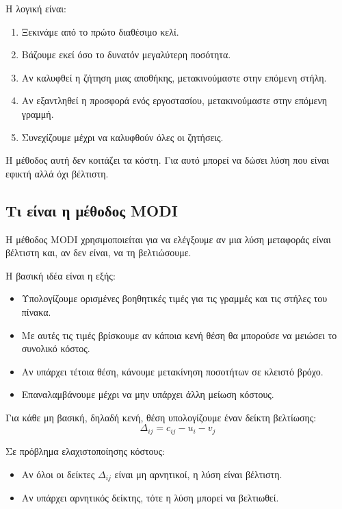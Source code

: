 \documentclass[12pt,a4paper]{article}
\begin{document}
Η λογική είναι:

\begin{enumerate}
    \item Ξεκινάμε από το πρώτο διαθέσιμο κελί.
    \item Βάζουμε εκεί όσο το δυνατόν μεγαλύτερη ποσότητα.
    \item Αν καλυφθεί η ζήτηση μιας αποθήκης, μετακινούμαστε στην επόμενη στήλη.
    \item Αν εξαντληθεί η προσφορά ενός εργοστασίου, μετακινούμαστε στην επόμενη γραμμή.
    \item Συνεχίζουμε μέχρι να καλυφθούν όλες οι ζητήσεις.
\end{enumerate}

Η μέθοδος αυτή δεν κοιτάζει τα κόστη. Για αυτό μπορεί να δώσει λύση που είναι εφικτή αλλά όχι βέλτιστη.

\subsection{Τι είναι η μέθοδος MODI}

Η μέθοδος MODI χρησιμοποιείται για να ελέγξουμε αν μια λύση μεταφοράς είναι βέλτιστη και, αν δεν είναι, να τη βελτιώσουμε.

Η βασική ιδέα είναι η εξής:

\begin{itemize}
    \item Υπολογίζουμε ορισμένες βοηθητικές τιμές για τις γραμμές και τις στήλες του πίνακα.
    \item Με αυτές τις τιμές βρίσκουμε αν κάποια κενή θέση θα μπορούσε να μειώσει το συνολικό κόστος.
    \item Αν υπάρχει τέτοια θέση, κάνουμε μετακίνηση ποσοτήτων σε κλειστό βρόχο.
    \item Επαναλαμβάνουμε μέχρι να μην υπάρχει άλλη μείωση κόστους.
\end{itemize}

Για κάθε μη βασική, δηλαδή κενή, θέση υπολογίζουμε έναν δείκτη βελτίωσης:
\[
\Delta_{ij}=c_{ij}-u_i-v_j
\]

Σε πρόβλημα ελαχιστοποίησης κόστους:

\begin{itemize}
    \item Αν όλοι οι δείκτες \(\Delta_{ij}\) είναι μη αρνητικοί, η λύση είναι βέλτιστη.
    \item Αν υπάρχει αρνητικός δείκτης, τότε η λύση μπορεί να βελτιωθεί.
\end{itemize}
\end{document}
